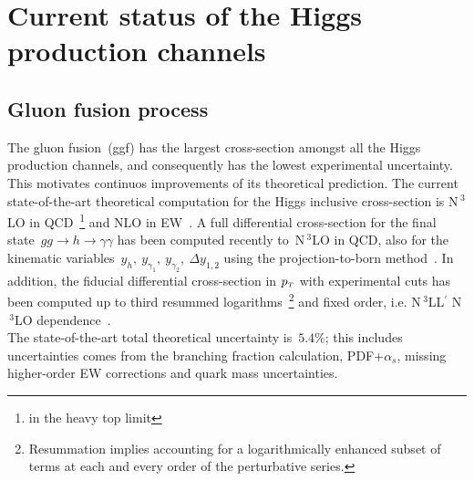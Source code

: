 \section{Current status of the Higgs production channels  \label{sec:singlehiggschannels}  }
\subsection{Gluon fusion process}
The  gluon fusion~(ggf) has the largest cross-section amongst all the Higgs production channels, and consequently has the lowest experimental uncertainty. This motivates continuos improvements of its theoretical prediction.  The current state-of-the-art theoretical computation for the Higgs inclusive cross-section is N$\,^3$LO in QCD~\footnote{in the heavy top limit} and NLO in EW~\cite{Bonetti:2018ukf}. A full differential cross-section for the final state~$ gg \to h \to \gamma \gamma$ has been computed recently to~N$\,^3$LO in QCD, also for the kinematic variables~$y_h, \ y_{\gamma_1},\ y_{\gamma_2},\ \Delta y_{1,2}$ using the projection-to-born method~\cite{Chen:2021isd}. In addition, the fiducial differential cross-section in $p_{\scriptscriptstyle T}$ with experimental cuts has been computed up to third resummed logarithms~\footnote{Resummation implies accounting for a logarithmically enhanced subset of terms at each and every order of the perturbative series.} and fixed order, i.e.  N$\,^3$LL$^\prime$   N$\,^3$LO dependence~\cite{Billis:2021ecs}. \\ The state-of-the-art total theoretical uncertainty is~$5.4 \%$; this includes  uncertainties comes from the branching fraction calculation, PDF+$\alpha_s$, missing higher-order EW corrections and quark mass uncertainties. 
